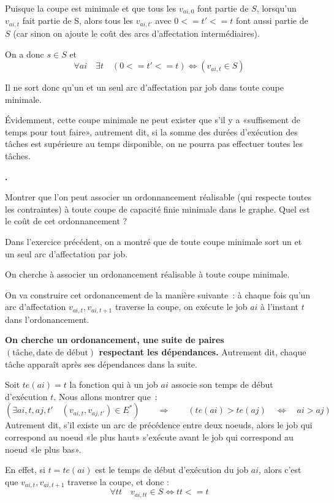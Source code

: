\documentclass{article}
\newcounter{enoncecount}
\newenvironment{enonce}
{
\stepcounter{enoncecount}
\bf\small \arabic{enoncecount}.
\begin{bf}
}
{
\end{bf}
}
\begin{document}
Puisque la coupe est minimale et que tous les $v_{ai,0}$ font partie de $S$, lorsqu'un $v_{ai,t}$ fait partie de S, alors tous les
$v_{ai,t'}$ avec $0 <= t' <= t$ font aussi partie de $S$ (car sinon on ajoute le coût des arcs d'affectation intermédiaires).

On a donc $s \in S$ et
\begin{equation}
\forall ai \quad \exists t \quad (0 <= t' <= t) \Leftrightarrow (v_{ai,t} \in S)
\label{eq:tous-t-debut-ligne}
\end{equation}

Il ne sort donc qu'un et un seul arc d'affectation par job dans toute coupe minimale.

Évidemment, cette coupe minimale ne peut exister que s'il y a «suffisement de temps pour tout faire», autrement dit, si la somme des durées
d'exécution des tâches est supérieure au temps disponible, on ne pourra pas effectuer toutes les tâches.

\begin{enonce}
Montrer que l'on peut associer un ordonnancement réalisable (qui respecte toutes les contraintes) à toute 
coupe de capacité finie minimale dans le graphe. Quel est le coût de cet ordonnancement ? 
\end{enonce}

Dans l'exercice précédent, on a montré que de toute coupe minimale sort un et un seul arc d'affectation par job.

On cherche à associer un ordonancement réalisable à toute coupe minimale.

On va construire cet ordonancement de la manière suivante~: à chaque
fois qu'un arc d'affectation $v_{ai,t}, v_{ai,t+1}$ traverse la coupe,
on exécute le job $ai$ à l'instant $t$ dans l'ordonancement. 

\textbf{On cherche un ordonancement, une suite de paires
$(\text{tâche},\text{date de début})$ respectant les dépendances.}
Autrement dit, chaque tâche apparaît après ses dépendances dans la
suite.

Soit $te(ai) = t$ la fonction qui à un job $ai$ associe son temps de début d'exécution $t$.
Nous allons montrer que~:
$$(\exists ai,t,aj,t' \quad (v_{ai,t},v_{aj,t'}) \in E^*) \qquad \Rightarrow \qquad (te(ai) > te(aj) \quad \Leftrightarrow \quad ai > aj)$$
Autrement dit, s'il existe un arc de précédence entre deux noeuds, alors le job qui
correspond au noeud «le plus haut» s'exécute avant le job qui correspond au
noeud «le plus bas».

En effet, si $t = te(ai)$ est le temps de début d'exécution du job $ai$, alors c'est que $v_{ai,t}, v_{ai,t+1}$
traverse la coupe, et donc :
\begin{equation}
  \forall tt \quad v_{ai,tt} \in S \Leftrightarrow tt <= t
  \label{eq:tous-t-avant-exec}
\end{equation}
\end{document}
